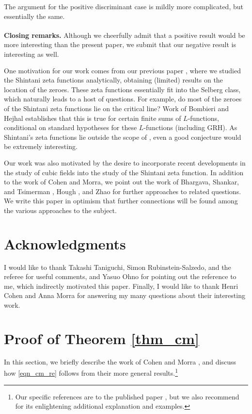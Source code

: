 \documentclass[12pt]{amsart}
\theoremstyle{remark}
\numberwithin{theorem}{section} \numberwithin{equation}{section}
\begin{document}
The argument for the positive discriminant case is mildly more complicated, but essentially the same.
\\
\\
{\bf Closing remarks.} Although we cheerfully admit that a positive result would be more interesting than the present paper,
we submit that our negative result is interesting as well.

One motivation for our work comes from our previous paper \cite{T}, where we studied the Shintani zeta functions analytically,
obtaining (limited) results on the location of
the zeroes. These zeta functions essentially fit into the Selberg class, which naturally leads to a host of questions.
For example, do most of the zeroes of the Shintani zeta functions
lie on the critical line? Work of Bombieri and Hejhal \cite{BH} establishes that this is true for certain finite sums of $L$-functions,
conditional on standard hypotheses for these $L$-functions (including GRH).
As Shintani's zeta functions lie outside the scope of \cite{BH},
even a good conjecture would be extremely interesting.

Our work was also motivated by the desire to incorporate recent developments in the study of cubic fields into the study
of the Shintani zeta function. In addition to the work of Cohen and Morra, we point out the work of 
Bhargava, Shankar, and Tsimerman \cite{BST}, Hough \cite{H}, and Zhao \cite{Z} for further approaches to related questions.
We write this paper in optimism that further connections will be found among the various approaches to the subject.

\section{Acknowledgments}
I would like to thank Takashi Taniguchi, Simon Rubinstein-Salzedo, and the referee for useful comments, and 
Yasuo Ohno
for pointing out the reference \cite{IS} to me, which indirectly motivated this paper.
Finally, I would like to thank Henri Cohen and Anna Morra for answering my many questions about their interesting work.

\section{Proof of Theorem \ref{thm_cm}}\label{sec_cm}
In this section, we briefly describe the work of Cohen and Morra \cite{CM, M}, and discuss how 
\eqref{eqn_cm_re} follows from their more general results.\footnote{Our specific references are to the published paper 
\cite{CM}, but we also recommend \cite{M} for its enlightening additional explanation and examples.} 
\end{document}
